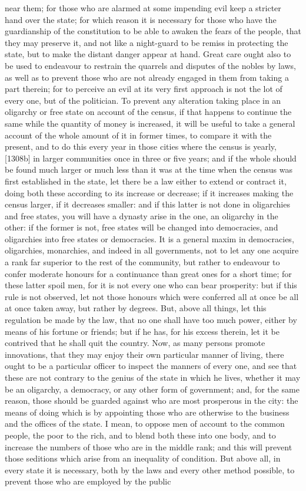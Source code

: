 \documentclass[12pt]{article}
\begin{document}
near them; for those who are alarmed at some impending evil keep a stricter hand over the state; for which reason it is necessary for those who have the guardianship of the constitution to be able to awaken the fears of the people, that they may preserve it, and not like a night-guard to be remiss in protecting the state, but to make the distant danger appear at hand. Great care ought also to be used to endeavour to restrain the quarrels and disputes of the nobles by laws, as well as to prevent those who are not already engaged in them from taking a part therein; for to perceive an evil at its very first approach is not the lot of every one, but of the politician. To prevent any alteration taking place in an oligarchy or free state on account of the census, if that happens to continue the same while the quantity of money is increased, it will be useful to take a general account of the whole amount of it in former times, to compare it with the present, and to do this every year in those cities where the census is yearly, [1308b] in larger communities once in three or five years; and if the whole should be found much larger or much less than it was at the time when the census was first established in the state, let there be a law either to extend or contract it, doing both these according to its increase or decrease; if it increases making the census larger, if it decreases smaller: and if this latter is not done in oligarchies and free states, you will have a dynasty arise in the one, an oligarchy in the other: if the former is not, free states will be changed into democracies, and oligarchies into free states or democracies. It is a general maxim in democracies, oligarchies, monarchies, and indeed in all governments, not to let any one acquire a rank far superior to the rest of the community, but rather to endeavour to confer moderate honours for a continuance than great ones for a short time; for these latter spoil men, for it is not every one who can bear prosperity: but if this rule is not observed, let not those honours which were conferred all at once be all at once taken away, but rather by degrees. But, above all things, let this regulation be made by the law, that no one shall have too much power, either by means of his fortune or friends; but if he has, for his excess therein, let it be contrived that he shall quit the country. Now, as many persons promote innovations, that they may enjoy their own particular manner of living, there ought to be a particular officer to inspect the manners of every one, and see that these are not contrary to the genius of the state in which he lives, whether it may be an oligarchy, a democracy, or any other form of government; and, for the same reason, those should be guarded against who are most prosperous in the city: the means of doing which is by appointing those who are otherwise to the business and the offices of the state. I mean, to oppose men of account to the common people, the poor to the rich, and to blend both these into one body, and to increase the numbers of those who are in the middle rank; and this will prevent those seditions which arise from an inequality of condition. But above all, in every state it is necessary, both by the laws and every other method possible, to prevent those who are employed by the public 
\end{document}
